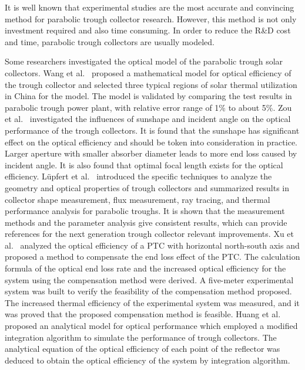 It is well known that experimental studies are the most accurate and convincing method for parabolic trough collector research. However, this method is not only investment required and also time consuming. In order to reduce the R\&D cost and time, parabolic trough collectors are usually modeled.

Some researchers investigated the optical model of the parabolic trough solar collectors.
Wang et al.~\cite{Wang2016} proposed a mathematical model for optical efficiency of the trough collector and selected three typical regions of solar thermal utilization in China for the model. The model is validated by comparing the test results in parabolic trough power plant, with relative error range of 1\% to about 5\%.
Zou et al.~\cite{Zou2017} investigated the influences of sunshape and incident angle on the optical performance of the trough collectors. It is found that the sunshape has significant effect on the optical efficiency and should be token into consideration in practice. Larger aperture with smaller absorber diameter leads to more end loss caused by incident angle. It is also found that optimal focal length exists for the optical efficiency.
L\"upfert et al.~\cite{Lupfert2006} introduced the specific techniques to analyze the geometry and optical properties of trough collectors and summarized results in collector shape measurement, flux measurement, ray tracing, and thermal performance analysis for parabolic troughs. It is shown that the measurement methods and the parameter analysis give consistent results, which can provide references for the next generation trough collector relevant improvements.
Xu et al.~\cite{Xu2014} analyzed the optical efficiency of a PTC with horizontal north-south axis and proposed a method to compensate the end loss effect of the PTC. The calculation formula of the optical end loss rate and the increased optical efficiency for the system using the compensation method were derived. A five-meter experimental system was built to verify the feasibility of the compensation method proposed. The increased thermal efficiency of the experimental system was measured, and it was proved that the proposed compensation method is feasible.
Huang et al.~\cite{Huang2012} proposed an analytical model for optical performance which employed a modified integration algorithm to simulate the performance of trough collectors. The analytical equation of the optical efficiency of each point of the reflector was deduced to obtain the optical efficiency of the system by integration algorithm.

